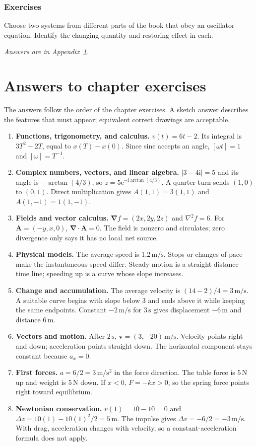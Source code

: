 \documentclass[11pt,oneside]{book}
\newcommand{\ii}{\mathrm{i}}
\newcommand{\ee}{\mathrm{e}}
\newcommand{\vect}[1]{\boldsymbol{#1}}
\newcommand{\grad}{\boldsymbol{\nabla}}
\newcommand{\lap}{\nabla^2}
\theoremstyle{reviewstyle}
\newcommand{\learningcheck}[1]{\subsection*{Exercises}\noindent #1\par\smallskip\noindent\emph{Answers are in Appendix~\ref{app:chapter-answers}.}}
\begin{document}
\learningcheck{Choose two systems from different parts of the book that obey an oscillator equation. Identify the changing quantity and restoring effect in each.}

\appendix
\chapter{Answers to chapter exercises}
\label{app:chapter-answers}
The answers follow the order of the chapter exercises. A sketch answer describes the features that must appear; equivalent correct drawings are acceptable.
\begin{enumerate}
\item \textbf{Functions, trigonometry, and calculus.} $v(t)=6t-2$. Its integral is $3T^2-2T$, equal to $x(T)-x(0)$. Since sine accepts an angle, $[\omega t]=1$ and $[\omega]=T^{-1}$.
\item \textbf{Complex numbers, vectors, and linear algebra.} $|3-4\ii|=5$ and its angle is $-\arctan(4/3)$, so $z=5\ee^{-\ii\arctan(4/3)}$. A quarter-turn sends $(1,0)$ to $(0,1)$. Direct multiplication gives $A(1,1)=3(1,1)$ and $A(1,-1)=1(1,-1)$.
\item \textbf{Fields and vector calculus.} $\grad f=(2x,2y,2z)$ and $\lap f=6$. For $\vect A=(-y,x,0)$, $\grad\cdot\vect A=0$. The field is nonzero and circulates; zero divergence only says it has no local net source.
\item \textbf{Physical models.} The average speed is $1.2\,\mathrm{m/s}$. Stops or changes of pace make the instantaneous speed differ. Steady motion is a straight distance--time line; speeding up is a curve whose slope increases.
\item \textbf{Change and accumulation.} The average velocity is $(14-2)/4=3\,\mathrm{m/s}$. A suitable curve begins with slope below $3$ and ends above it while keeping the same endpoints. Constant $-2\,\mathrm{m/s}$ for $3\,\mathrm s$ gives displacement $-6\,\mathrm m$ and distance $6\,\mathrm m$.
\item \textbf{Vectors and motion.} After $2\,\mathrm s$, $\vect v=(3,-20)\,\mathrm{m/s}$. Velocity points right and down; acceleration points straight down. The horizontal component stays constant because $a_x=0$.
\item \textbf{First forces.} $a=6/2=3\,\mathrm{m/s^2}$ in the force direction. The table force is $5\,\mathrm N$ up and weight is $5\,\mathrm N$ down. If $x<0$, $F=-kx>0$, so the spring force points right toward equilibrium.
\item \textbf{Newtonian conservation.} $v(1)=10-10=0$ and $\Delta z=10(1)-10(1)^2/2=5\,\mathrm m$. The impulse gives $\Delta v=-6/2=-3\,\mathrm{m/s}$. With drag, acceleration changes with velocity, so a constant-acceleration formula does not apply.

\end{enumerate}
\end{document}
